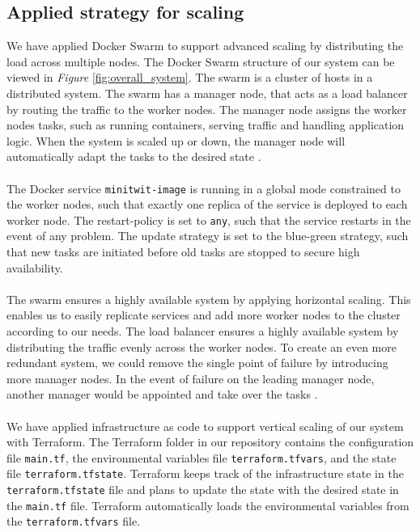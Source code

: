 \subsection{Applied strategy for scaling}
We have applied Docker Swarm to support advanced scaling by distributing the load across multiple nodes. The Docker Swarm structure of our system can be viewed in \textit{Figure} \ref{fig:overall_system}. The swarm is a cluster of hosts in a distributed system. The swarm has a manager node, that acts as a load balancer by routing the traffic to the worker nodes. The manager node assigns the worker nodes tasks, such as running containers, serving traffic and handling application logic. When the system is scaled up or down, the manager node will automatically adapt the tasks to the desired state \cite{swarm}. 
\\
\\
The Docker service \texttt{minitwit-image} is running in a global mode constrained to the worker nodes, such that exactly one replica of the service is deployed to each worker node. The restart-policy is set to \texttt{any}, such that the service restarts in the event of any problem. The update strategy is set to the blue-green strategy, such that new tasks are initiated before old tasks are stopped to secure high availability.  
\\
\\
The swarm ensures a highly available system by applying horizontal scaling. This enables us to easily replicate services and add more worker nodes to the cluster according to our needs. The load balancer ensures a highly available system by distributing the traffic evenly across the worker nodes. To create an even more redundant system, we could remove the single point of failure by introducing more manager nodes. In the event of failure on the leading manager node, another manager would be appointed and take over the tasks \cite{slides9}. 
\\
\\
We have applied infrastructure as code to support vertical scaling of our system with Terraform. The Terraform folder in our repository contains the configuration file \texttt{main.tf}, the environmental variables file \texttt{terraform.tfvars}, and the state file \texttt{terraform.tfstate}. Terraform keeps track of the infrastructure state in the \texttt{terraform.tfstate} file and plans to update the state with the desired state in the \texttt{main.tf} file. 
Terraform automatically loads the environmental variables from the \texttt{terraform.tfvars} file.
